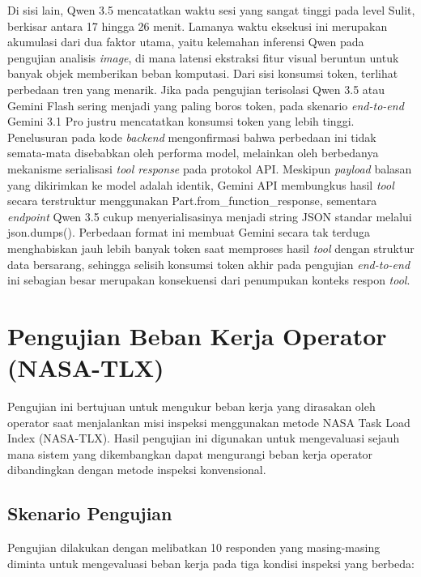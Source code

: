 Di sisi lain, Qwen 3.5 mencatatkan waktu sesi yang sangat tinggi pada level Sulit, berkisar antara 17 hingga 26 menit. Lamanya waktu eksekusi ini merupakan akumulasi dari dua faktor utama, yaitu kelemahan inferensi Qwen pada pengujian analisis \textit{image}, di mana latensi ekstraksi fitur visual beruntun untuk banyak objek memberikan beban komputasi. Dari sisi konsumsi token, terlihat perbedaan tren yang menarik. Jika pada pengujian terisolasi Qwen 3.5 atau Gemini Flash sering menjadi yang paling boros token, pada skenario \textit{end-to-end} Gemini 3.1 Pro justru mencatatkan konsumsi token yang lebih tinggi. Penelusuran pada kode \textit{backend} mengonfirmasi bahwa perbedaan ini tidak semata-mata disebabkan oleh performa model, melainkan oleh berbedanya mekanisme serialisasi \textit{tool response} pada protokol API. Meskipun \textit{payload} balasan yang dikirimkan ke model adalah identik, Gemini API membungkus hasil \textit{tool} secara terstruktur menggunakan Part.from\_function\_response, sementara \textit{endpoint} Qwen 3.5 cukup menyerialisasinya menjadi string JSON standar melalui json.dumps(). Perbedaan format ini membuat Gemini secara tak terduga menghabiskan jauh lebih banyak token saat memproses hasil \textit{tool} dengan struktur data bersarang, sehingga selisih konsumsi token akhir pada pengujian \textit{end-to-end} ini sebagian besar merupakan konsekuensi dari penumpukan konteks respon \textit{tool}.



\section{Pengujian Beban Kerja Operator (NASA-TLX)}
\label{sec:pengujian_nasa_tlx}

Pengujian ini bertujuan untuk mengukur beban kerja yang dirasakan oleh operator saat menjalankan misi inspeksi menggunakan metode NASA Task Load Index (NASA-TLX). Hasil pengujian ini digunakan untuk mengevaluasi sejauh mana sistem yang dikembangkan dapat mengurangi beban kerja operator dibandingkan dengan metode inspeksi konvensional.

\subsection{Skenario Pengujian}
Pengujian dilakukan dengan melibatkan 10 responden yang masing-masing diminta untuk mengevaluasi beban kerja pada tiga kondisi inspeksi yang berbeda:

